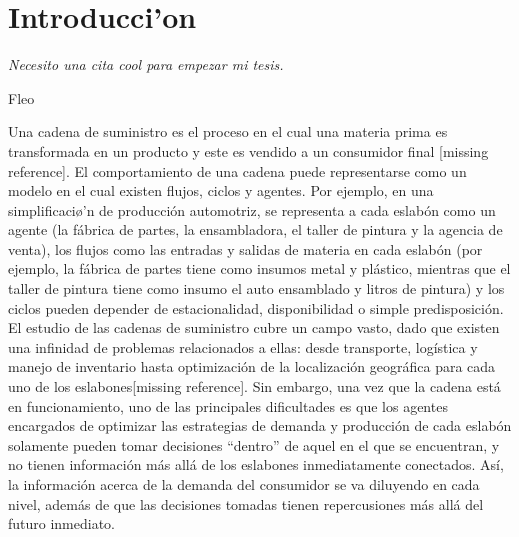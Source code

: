 \chapter{Introducci'on}

\textit{Necesito una cita cool para empezar mi tesis.}
\begin{flushright}
 Fleo
 \end{flushright}

\vspace{10 pt}


Una cadena de suministro es el proceso en el cual una materia prima es transformada en un producto y este es vendido a un consumidor final [missing reference]. El comportamiento de una cadena puede representarse como un modelo en el cual existen flujos, ciclos y agentes. Por ejemplo, en una simplificaci\o'n de producci\'on automotriz, se representa a cada eslab\'on como un agente (la f\'abrica de partes, la ensambladora, el taller de pintura y la agencia de venta), los flujos como las entradas y salidas de materia en cada eslab\'on (por ejemplo, la f\'abrica de partes tiene como insumos metal y pl\'astico, mientras que el taller de pintura tiene como insumo el auto ensamblado y litros de pintura) y los ciclos pueden depender de estacionalidad, disponibilidad o simple predisposici\'on.\\

El estudio de las cadenas de suministro cubre un campo vasto, dado que existen una infinidad de problemas relacionados a ellas: desde transporte, log\'istica y manejo de inventario hasta optimizaci\'on de la localizaci\'on geogr\'afica para cada uno de los eslabones[missing reference]. Sin embargo, una vez que la cadena est\'a en funcionamiento, uno de las principales dificultades es que los agentes encargados de optimizar las estrategias de demanda y producci\'on de cada eslab\'on solamente pueden tomar decisiones ``dentro'' de aquel en el que se encuentran, y no tienen informaci\'on m\'as all\'a de los eslabones inmediatamente conectados. As\'i, la informaci\'on acerca de la demanda del consumidor se va diluyendo en cada nivel, además de que las decisiones tomadas tienen repercusiones m\'as all\'a del futuro inmediato. \\

